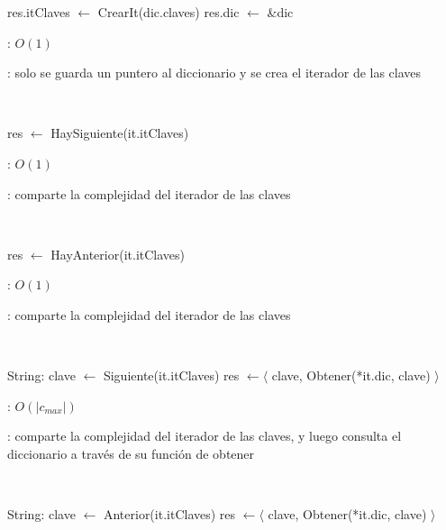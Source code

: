\begin{Algoritmos}

	\begin{algorithm}[H]
		\NoCaptionOfAlgo
		\caption{}
		res.itClaves $\leftarrow$ CrearIt(dic.claves)
		res.dic $\leftarrow$ \&dic
	\end{algorithm}

	\complejidad: $O(1)$

	\justifcomp: solo se guarda un puntero al diccionario y se crea el iterador de las claves

	~

	\begin{algorithm}[H]
		\NoCaptionOfAlgo
		\caption{}
		res $\leftarrow$ HaySiguiente(it.itClaves)
	\end{algorithm}

	\complejidad: $O(1)$

	\justifcomp: comparte la complejidad del iterador de las claves

	~

	\begin{algorithm}[H]
		\NoCaptionOfAlgo
		\caption{}
		res $\leftarrow$ HayAnterior(it.itClaves)
	\end{algorithm}

	\complejidad: $O(1)$

	\justifcomp: comparte la complejidad del iterador de las claves

	~

	\begin{algorithm}[H]
		\NoCaptionOfAlgo
		\caption{}
		String: clave $\leftarrow$ Siguiente(it.itClaves)
		res $\leftarrow \langle$ clave, Obtener(*it.dic, clave) $\rangle$
	\end{algorithm}

	\complejidad: $O(|c_{max}|)$

	\justifcomp: comparte la complejidad del iterador de las claves, y luego consulta el diccionario a través de su función de obtener

	~

	\begin{algorithm}[H]
		\NoCaptionOfAlgo
		\caption{}
		String: clave $\leftarrow$ Anterior(it.itClaves)
		res $\leftarrow \langle$ clave, Obtener(*it.dic, clave) $\rangle$
	\end{algorithm}


\end{Algoritmos}
